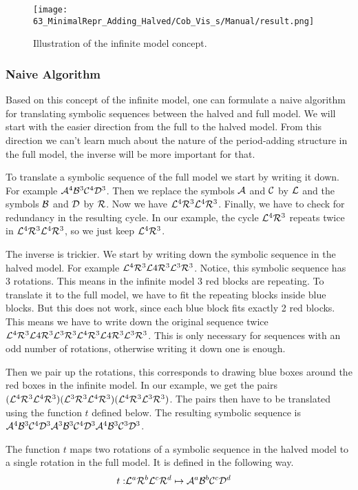\begin{figure}
	\centering
	\texttt{[image: 63\_MinimalRepr\_Adding\_Halved/Cob\_Vis\_s/Manual/result.png]}
	\caption{Illustration of the infinite model concept.}
	\label{fig:minrep.infinite.model.concept}
\end{figure}

\subsubsection{Naive Algorithm}

Based on this concept of the infinite model, one can formulate a naive algorithm for translating symbolic sequences between the halved and full model.
We will start with the easier direction from the full to the halved model.
From this direction we can't learn much about the nature of the period-adding structure in the full model, the inverse will be more important for that.

To translate a symbolic sequence of the full model we start by writing it down.
For example $\mathcal{A}^4\mathcal{B}^3\mathcal{C}^4\mathcal{D}^3$.
Then we replace the symbols $\mathcal{A}$ and $\mathcal{C}$ by $\mathcal{L}$ and the symbols $\mathcal{B}$ and $\mathcal{D}$ by $\mathcal{R}$.
Now we have $\mathcal{L}^4\mathcal{R}^3\mathcal{L}^4\mathcal{R}^3$.
Finally, we have to check for redundancy in the resulting cycle.
In our example, the cycle $\mathcal{L}^4\mathcal{R}^3$ repeats twice in $\mathcal{L}^4\mathcal{R}^3\mathcal{L}^4\mathcal{R}^3$, so we just keep $\mathcal{L}^4\mathcal{R}^3$.

The inverse is trickier.
We start by writing down the symbolic sequence in the halved model.
For example $\mathcal{L}^4\mathcal{R}^3\mathcal{L}4\mathcal{R}^3\mathcal{L}^3\mathcal{R}^3$.
Notice, this symbolic sequence has 3 rotations.
This means in the infinite model 3 red blocks are repeating.
To translate it to the full model, we have to fit the repeating blocks inside blue blocks.
But this does not work, since each blue block fits exactly 2 red blocks.
This means we have to write down the original sequence twice $\mathcal{L}^4\mathcal{R}^3\mathcal{L}4\mathcal{R}^3\mathcal{L}^3\mathcal{R}^3\mathcal{L}^4\mathcal{R}^3\mathcal{L}4\mathcal{R}^3\mathcal{L}^3\mathcal{R}^3$.
This is only necessary for sequences with an odd number of rotations, otherwise writing it down one is enough.

Then we pair up the rotations, this corresponds to drawing blue boxes around the red boxes in the infinite model.
In our example, we get the pairs $(\mathcal{L}^4\mathcal{R}^3\mathcal{L}^4\mathcal{R}^3)(\mathcal{L}^3\mathcal{R}^3\mathcal{L}^4\mathcal{R}^3)(\mathcal{L}^4\mathcal{R}^3\mathcal{L}^3\mathcal{R}^3)$.
The pairs then have to be translated using the function $t$ defined below.
The resulting symbolic sequence is $\mathcal{A}^4\mathcal{B}^3\mathcal{C}^4\mathcal{D}^3\mathcal{A}^3\mathcal{B}^3\mathcal{C}^4\mathcal{D}^3\mathcal{A}^4\mathcal{B}^3\mathcal{C}^3\mathcal{D}^3$.

\begin{definition}
	The function $t$ maps two rotations of a symbolic sequence in the halved model to a single rotation in the full model.
	It is defined in the following way.
	\begin{align}
		t: & \mathcal{L}^a\mathcal{R}^b\mathcal{L}^c\mathcal{R}^d \mapsto \mathcal{A}^a\mathcal{B}^b\mathcal{C}^c\mathcal{D}^d
	\end{align}
\end{definition}

